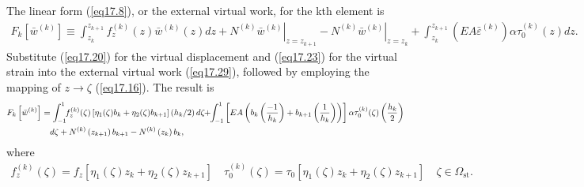 \documentclass{AeroStructure-ERJohnson}
\begin{document}
The linear form (\ref{eq17.8}), or the external virtual work, for the kth element is
\begin{align}\label{eq17.29}
F_{k}\left[\bar{w}^{(k)}\right] \equiv \int_{z_{k}}^{z_{k+1}} f_{z}^{(k)}(z) \bar{w}^{(k)}(z) d z+\left.N^{(k)} \bar{w}^{(k)}\right|_{z=z_{k+1}}-\left.N^{(k)} \bar{w}^{(k)}\right|_{z=z_{k}}+\int_{z_{k}}^{z_{k+1}}(E A \bar{\varepsilon}^{(k)}) \alpha \tau_0^{(k)}(z) d z.
\end{align}
Substitute (\ref{eq17.20}) for the virtual displacement and (\ref{eq17.23}) for the virtual strain into the external virtual work (\ref{eq17.29}), followed by employing the mapping of $z \rightarrow \zeta$ (\ref{eq17.16}). The result is
\begin{align}
F_{k}\left[\bar{w}^{(k)}\right]&= \int_{-1}^{1}\hspace*{-3pt} f_{z}^{(k)}(\zeta)\left[\eta_{1}(\zeta) b_{k}+\eta_{2}(\zeta) b_{k+1}\right]\left(h_{k}/2\right) d \zeta\hspace*{-3pt}+\hspace*{-3pt}\int_{-1}^{1}\left[E A\left(b_{k}\left(\frac{-1}{h_{k}}\right)+b_{k+1}\left(\frac{1}{h_{k}}\right)\right)\right] \alpha \tau_{0}^{(k)}(\zeta)\left(\frac{h_{k}}{2}\right)  \nonumber\\
&\quad d \zeta+N^{(k)}\left(z_{k+1}\right) b_{k+1}-N^{(k)}\left(z_{k}\right) b_{k}, \label{eq17.30}
\end{align}
where
\begin{align}\label{eq17.31}
f_{z}^{\left({k}\right)}(\zeta)=f_{z}\left[\eta_{1}(\zeta) z_{k}+\eta_{2}(\zeta) z_{k+1}\right] \quad \tau_{0}^{(k)}(\zeta)=\tau_{0}\left[\eta_{1}(\zeta) z_{k}+\eta_{2}(\zeta) z_{k+1}\right] \quad \zeta \in \Omega_{\mathrm{st}}.
\end{align}

\vspace*{-1pc}\pagebreak
\end{document}

